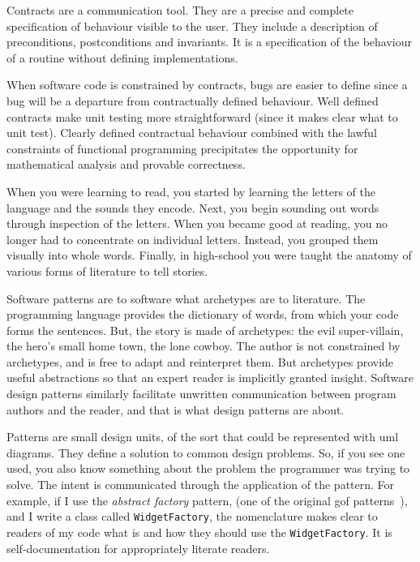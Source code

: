 %
Contracts are a communication tool. They are a precise and complete
specification of behaviour visible to the user. They include a description of
preconditions, postconditions and invariants. It is a specification of the
behaviour of a routine without defining implementations.

When software code is constrained by contracts, bugs are easier to define since
a bug will be a departure from contractually defined behaviour. Well defined
contracts make unit testing more straightforward (since it makes clear what to
unit test). Clearly defined contractual behaviour combined with the lawful
constraints of functional programming precipitates the opportunity for
mathematical analysis and provable correctness.

When you were learning to read, you started by learning the letters of the
language and the sounds they encode. Next, you begin sounding out words through
inspection of the letters. When you became good at reading, you no longer had to
concentrate on individual letters. Instead, you grouped them visually into whole
words. Finally, in high-school you were taught the anatomy of various forms of
literature to tell stories.

Software patterns are to software what archetypes are to literature. The
programming language provides the dictionary of words, from which your code
forms the sentences. But, the story is made of archetypes: the evil
super-villain, the hero's small home town, the lone cowboy. The author is not
constrained by archetypes, and is free to adapt and reinterpret them. But
archetypes provide useful abstractions so that an expert reader is implicitly
granted insight. Software design patterns similarly facilitate unwritten
communication between program authors and the reader, and that is what design
patterns are about.

Patterns are small design units, of the sort that could be represented with
\ac{uml} diagrams. They define a solution to common design problems. So, if you
see one used, you also know something about the problem the programmer was
trying to solve. The intent is communicated through the application of the
pattern. For example, if I use the \emph{abstract factory} pattern, (one of the
original \ac{gof} patterns~\cite{GOF}), and I write a class called
\verb|WidgetFactory|, the nomenclature makes clear to readers of my code what is
and how they should use the \verb|WidgetFactory|. It is self-documentation for
appropriately literate readers.

